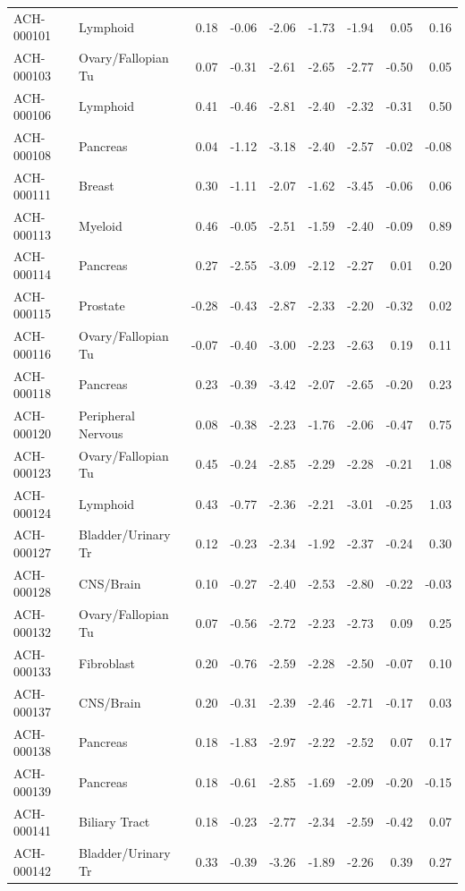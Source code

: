 \begin{footnotesize}
\begin{longtable}{llrrrrrrr}
ACH-000101 & Lymphoid & 0.18 & -0.06 & -2.06 & -1.73 & -1.94 & 0.05 & 0.16 \\
ACH-000103 & Ovary/Fallopian Tu & 0.07 & -0.31 & -2.61 & -2.65 & -2.77 & -0.50 & 0.05 \\
ACH-000106 & Lymphoid & 0.41 & -0.46 & -2.81 & -2.40 & -2.32 & -0.31 & 0.50 \\
ACH-000108 & Pancreas & 0.04 & -1.12 & -3.18 & -2.40 & -2.57 & -0.02 & -0.08 \\
ACH-000111 & Breast & 0.30 & -1.11 & -2.07 & -1.62 & -3.45 & -0.06 & 0.06 \\
ACH-000113 & Myeloid & 0.46 & -0.05 & -2.51 & -1.59 & -2.40 & -0.09 & 0.89 \\
ACH-000114 & Pancreas & 0.27 & -2.55 & -3.09 & -2.12 & -2.27 & 0.01 & 0.20 \\
ACH-000115 & Prostate & -0.28 & -0.43 & -2.87 & -2.33 & -2.20 & -0.32 & 0.02 \\
ACH-000116 & Ovary/Fallopian Tu & -0.07 & -0.40 & -3.00 & -2.23 & -2.63 & 0.19 & 0.11 \\
ACH-000118 & Pancreas & 0.23 & -0.39 & -3.42 & -2.07 & -2.65 & -0.20 & 0.23 \\
ACH-000120 & Peripheral Nervous & 0.08 & -0.38 & -2.23 & -1.76 & -2.06 & -0.47 & 0.75 \\
ACH-000123 & Ovary/Fallopian Tu & 0.45 & -0.24 & -2.85 & -2.29 & -2.28 & -0.21 & 1.08 \\
ACH-000124 & Lymphoid & 0.43 & -0.77 & -2.36 & -2.21 & -3.01 & -0.25 & 1.03 \\
ACH-000127 & Bladder/Urinary Tr & 0.12 & -0.23 & -2.34 & -1.92 & -2.37 & -0.24 & 0.30 \\
ACH-000128 & CNS/Brain & 0.10 & -0.27 & -2.40 & -2.53 & -2.80 & -0.22 & -0.03 \\
ACH-000132 & Ovary/Fallopian Tu & 0.07 & -0.56 & -2.72 & -2.23 & -2.73 & 0.09 & 0.25 \\
ACH-000133 & Fibroblast & 0.20 & -0.76 & -2.59 & -2.28 & -2.50 & -0.07 & 0.10 \\
ACH-000137 & CNS/Brain & 0.20 & -0.31 & -2.39 & -2.46 & -2.71 & -0.17 & 0.03 \\
ACH-000138 & Pancreas & 0.18 & -1.83 & -2.97 & -2.22 & -2.52 & 0.07 & 0.17 \\
ACH-000139 & Pancreas & 0.18 & -0.61 & -2.85 & -1.69 & -2.09 & -0.20 & -0.15 \\
ACH-000141 & Biliary Tract & 0.18 & -0.23 & -2.77 & -2.34 & -2.59 & -0.42 & 0.07 \\
ACH-000142 & Bladder/Urinary Tr & 0.33 & -0.39 & -3.26 & -1.89 & -2.26 & 0.39 & 0.27 \\

\end{longtable}
\end{footnotesize}
